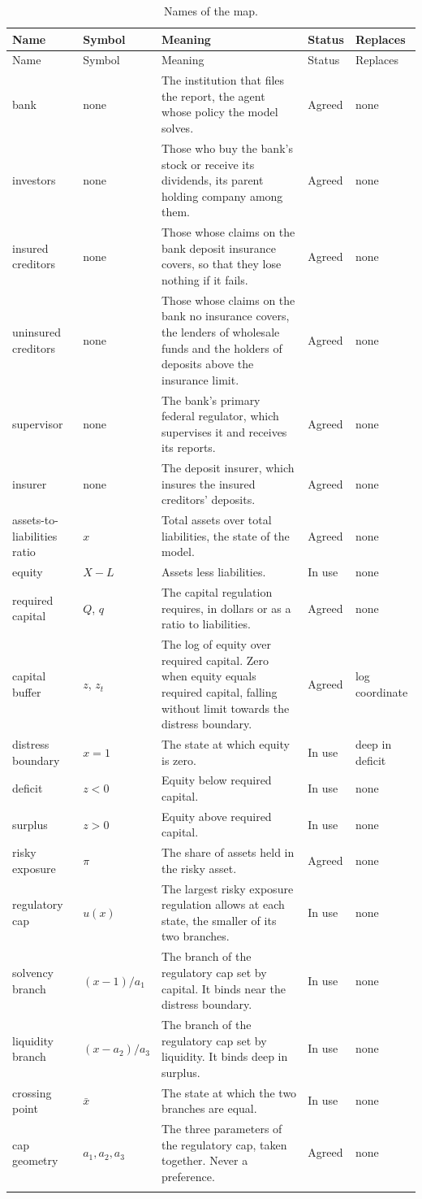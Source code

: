 \documentclass[11pt]{article}
\newcommand{\nrow}[5]{#1 & #2 & #3 & #4 & #5 \\ \addlinespace}
\begin{document}
\footnotesize
\begin{longtable}{@{}P{3.3cm}P{1.5cm}P{6.0cm}P{1.3cm}P{2.6cm}@{}}
\caption{Names of the map.}\label{tab:names}\\
\toprule
Name & Symbol & Meaning & Status & Replaces \\
\midrule
\endfirsthead
\toprule
Name & Symbol & Meaning & Status & Replaces \\
\midrule
\endhead
\nrow{bank}{none}{The institution that files the report, the agent whose policy the model solves.}{Agreed}{none}
\nrow{investors}{none}{Those who buy the bank's stock or receive its dividends, its parent holding company among them.}{Agreed}{none}
\nrow{insured creditors}{none}{Those whose claims on the bank deposit insurance covers, so that they lose nothing if it fails.}{Agreed}{none}
\nrow{uninsured creditors}{none}{Those whose claims on the bank no insurance covers, the lenders of wholesale funds and the holders of deposits above the insurance limit.}{Agreed}{none}
\nrow{supervisor}{none}{The bank's primary federal regulator, which supervises it and receives its reports.}{Agreed}{none}
\nrow{insurer}{none}{The deposit insurer, which insures the insured creditors' deposits.}{Agreed}{none}
\nrow{assets-to-liabilities ratio}{$x$}{Total assets over total liabilities, the state of the model.}{Agreed}{none}
\nrow{equity}{$X-L$}{Assets less liabilities.}{In use}{none}
\nrow{required capital}{$Q$, $q$}{The capital regulation requires, in dollars or as a ratio to liabilities.}{Agreed}{none}
\nrow{capital buffer}{$z$, $z_t$}{The log of equity over required capital. Zero when equity equals required capital, falling without limit towards the distress boundary.}{Agreed}{log coordinate}
\nrow{distress boundary}{$x=1$}{The state at which equity is zero.}{In use}{deep in deficit}
\nrow{deficit}{$z<0$}{Equity below required capital.}{In use}{none}
\nrow{surplus}{$z>0$}{Equity above required capital.}{In use}{none}
\nrow{risky exposure}{$\pi$}{The share of assets held in the risky asset.}{Agreed}{none}
\nrow{regulatory cap}{$u(x)$}{The largest risky exposure regulation allows at each state, the smaller of its two branches.}{In use}{none}
\nrow{solvency branch}{$(x-1)/a_1$}{The branch of the regulatory cap set by capital. It binds near the distress boundary.}{In use}{none}
\nrow{liquidity branch}{$(x-a_2)/a_3$}{The branch of the regulatory cap set by liquidity. It binds deep in surplus.}{In use}{none}
\nrow{crossing point}{$\bar x$}{The state at which the two branches are equal.}{In use}{none}
\nrow{cap geometry}{$a_1,a_2,a_3$}{The three parameters of the regulatory cap, taken together. Never a preference.}{Agreed}{none}

\end{longtable}
\end{document}
